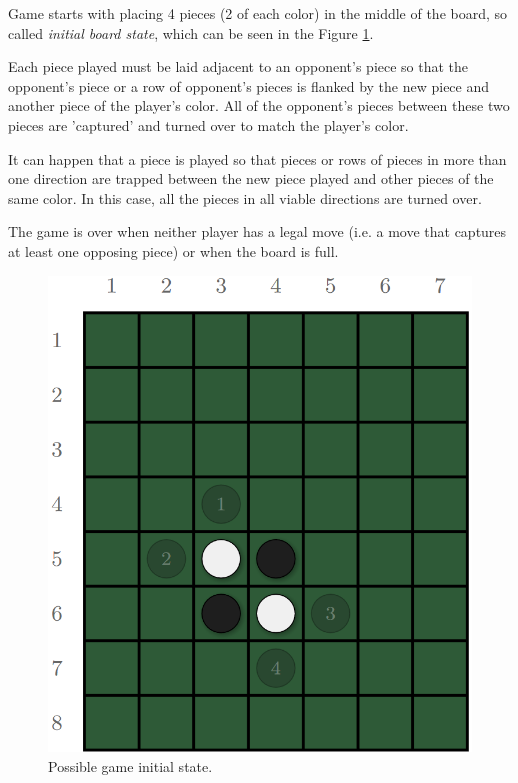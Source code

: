 \documentclass[english, sem, kiv, he, iso690alph, pdf, viewonly]{fasthesis}
\begin{document}
Game starts with placing 4 pieces (2 of each color) in the middle of the board, so called \textit{initial board state}, which can be seen in the Figure \ref{fig:Initial_game_state}.

Each piece played must be laid adjacent to an opponent's piece so that the opponent's piece or a row of opponent's pieces is flanked by the new piece and another piece of the player's color. All of the opponent's pieces between these two pieces are 'captured' and turned over to match the player's color.

It can happen that a piece is played so that pieces or rows of pieces in more than one direction are trapped between the new piece played and other pieces of the same color. In this case, all the pieces in all viable directions are turned over.

The game is over when neither player has a legal move (i.e. a move that captures at least one opposing piece) or when the board is full.

\begin{figure}[h!]
	\centering
	\begin{minipage}[b]{0.4\textwidth}
		\centering
		\includegraphics[width=\textwidth]{resources/game-initial-state.png}
    \end{minipage}
	\caption{Possible game initial state.}
	\label{fig:Initial_game_state}
\end{figure}
\end{document}
